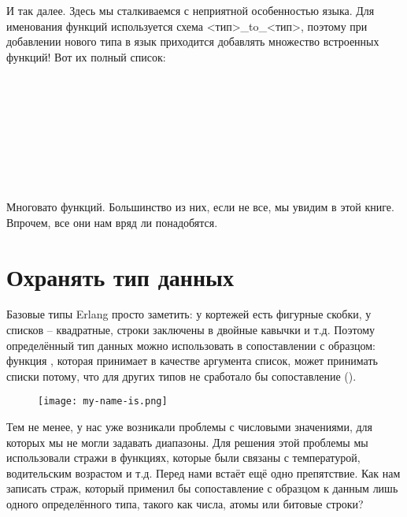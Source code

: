 И так далее.
Здесь мы сталкиваемся с неприятной особенностью языка.
Для именования функций используется схема <тип>\_to\_<тип>, поэтому при добавлении нового типа в язык приходится добавлять множество встроенных функций!
Вот их полный список:
\\
\\
\\
\\
\\
\\
\\
\\
\\

Многовато функций.
Большинство из них, если не все, мы увидим в этой книге.
Впрочем, все они нам вряд ли понадобятся.
\section{Охранять тип данных}
Базовые типы Erlang просто заметить: у кортежей есть фигурные скобки, у списков \--- квадратные, строки заключены в двойные кавычки и т.д.
Поэтому определённый тип данных можно использовать в сопоставлении с образцом: функция , которая принимает в качестве аргумента список, может принимать списки потому, что для других типов не сработало бы сопоставление (\ops{[H|\_]}).
\begin{figure}[h!]
    \centering
    \texttt{[image: my-name-is.png]}
\end{figure} 

Тем не менее, у нас уже возникали проблемы с числовыми значениями, для которых мы не могли задавать диапазоны.
Для решения этой проблемы мы использовали стражи в функциях, которые были связаны с температурой, водительским возрастом и т.д.
Перед нами встаёт ещё одно препятствие.
Как нам записать страж, который применил бы сопоставление с образцом к данным лишь одного определённого типа, такого как числа, атомы или битовые строки?

